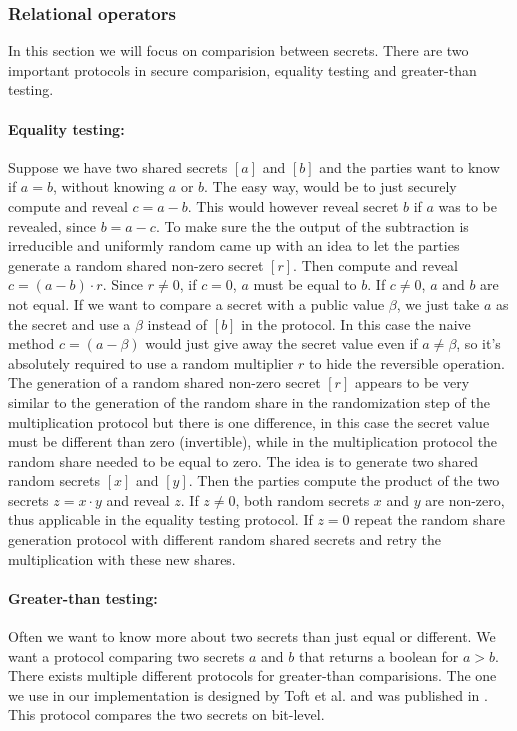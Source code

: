 \subsubsection{Relational operators}
In this section we will focus on comparision between secrets. There are two important protocols in secure comparision, equality testing and greater-than testing.

\paragraph{Equality testing:}
Suppose we have two shared secrets $[a]$ and $[b]$ and the parties want to know if $a = b$, without knowing $a$ or $b$.
The easy way, would be to just securely compute and reveal $c = a - b$. This would however reveal secret $b$ if $a$ was to be revealed, since $b = a - c$. To make sure the the output of the subtraction is irreducible and uniformly random \cite{franklin1996joint} came up with an idea to let the parties generate a random shared non-zero secret $[r]$.
Then compute and reveal $c = (a - b) \cdot r$. Since $r \neq 0$, if $c = 0$, $a$ must be equal to $b$. If $c \neq 0$, $a$ and $b$ are not equal. If we want to compare a secret with a public value $\beta$, we just take $a$ as the secret and use a $\beta$ instead of $[b]$ in the protocol. In this case the naive method $c = (a - \beta)$ would just give away the secret value even if $a \neq \beta$, so it's absolutely required to use a random multiplier $r$ to hide the reversible operation.\\

The generation of a random shared non-zero secret $[r]$ appears to be very similar to the generation of the random share in the randomization step of the multiplication protocol but there is one difference, in this case the secret value must be different than zero (invertible), while in the multiplication protocol the random share needed to be equal to zero. The idea is to generate two shared random secrets $[x]$ and $[y]$. Then the parties compute the product of the two secrets $z = x \cdot y$ and reveal $z$. If $z \neq 0$, both random secrets $x$ and $y$ are non-zero, thus applicable in the equality testing protocol. If $z = 0$ repeat the random share generation protocol with different random shared secrets and retry the multiplication with these new shares.

\paragraph{Greater-than testing:}
Often we want to know more about two secrets than just equal or different. We want a protocol comparing two secrets $a$ and $b$ that returns a boolean for $a>b$. There exists multiple different protocols for greater-than comparisions. The one we use in our implementation is designed by Toft et al. and was published in \cite{erkin2009privacy}. This protocol compares the two secrets on bit-level.

